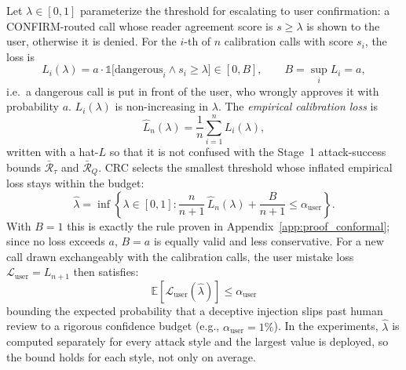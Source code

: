 Let $\lambda \in [0, 1]$ parameterize the threshold for escalating to user confirmation: a CONFIRM-routed call whose reader agreement score is $s \ge \lambda$ is shown to the user, otherwise it is denied. For the $i$-th of $n$ calibration calls with score $s_i$, the loss is
\begin{equation}
    L_i(\lambda) = a \cdot \mathbb{1}\big[\text{dangerous}_i \wedge s_i \ge \lambda\big] \in [0, B], \qquad B = \sup_i L_i = a,
\end{equation}
i.e.\ a dangerous call is put in front of the user, who wrongly approves it with probability $a$. $L_i(\lambda)$ is non-increasing in $\lambda$. The \emph{empirical calibration loss} is
\begin{equation}
    \hat{L}_n(\lambda) = \frac{1}{n}\sum_{i=1}^{n} L_i(\lambda),
\end{equation}
written with a hat-$L$ so that it is not confused with the Stage~1 attack-success bounds $\bar{\mathcal{R}}_\tau$ and $\bar{\mathcal{R}}_Q$. CRC selects the smallest threshold whose inflated empirical loss stays within the budget:
\begin{equation}
    \hat{\lambda} = \inf\left\{ \lambda \in [0, 1] : \frac{n}{n+1}\,\hat{L}_n(\lambda) + \frac{B}{n+1} \le \alpha_{\mathrm{user}} \right\}.
\end{equation}
With $B = 1$ this is exactly the rule proven in Appendix~\ref{app:proof_conformal}; since no loss exceeds $a$, $B = a$ is equally valid and less conservative. For a new call drawn exchangeably with the calibration calls, the user mistake loss $\mathcal{L}_{\mathrm{user}} = L_{n+1}$ then satisfies:
\begin{equation}
    \mathbb{E}\left[\mathcal{L}_{\mathrm{user}}(\hat{\lambda})\right] \le \alpha_{\mathrm{user}}
\end{equation}
bounding the expected probability that a deceptive injection slips past human review to a rigorous confidence budget (e.g., $\alpha_{\mathrm{user}} = 1\%$). In the experiments, $\hat{\lambda}$ is computed separately for every attack style and the largest value is deployed, so the bound holds for each style, not only on average.

